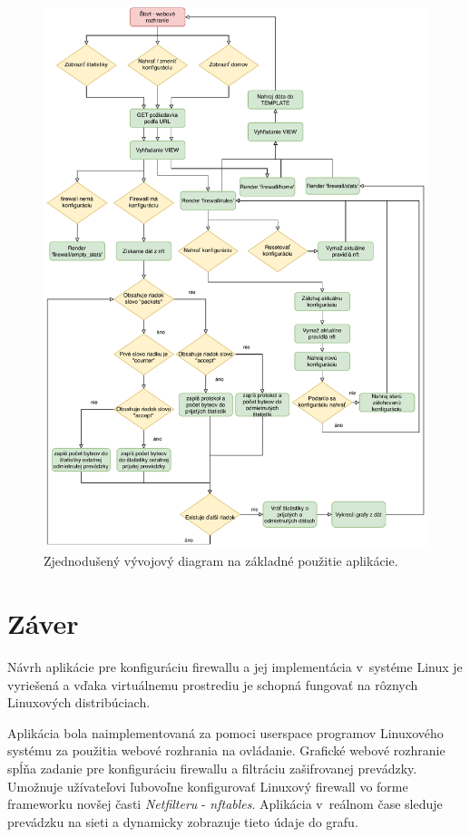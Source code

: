 \begin{figure}[h]
	\centering
	\includegraphics[scale=0.73]{obrazky-figures/flowchart.pdf}
	\caption{Zjednodušený vývojový diagram na základné použitie aplikácie.}
	\label{flowchart}
\end{figure}

\chapter*{Záver}

Návrh aplikácie pre konfiguráciu firewallu a jej implementácia v~systéme Linux je vyriešená a vďaka virtuálnemu prostrediu je schopná fungovať na rôznych Linuxových distribúciach. 

Aplikácia bola naimplementovaná za pomoci userspace programov Linuxového systému za použitia webové rozhrania na ovládanie.
Grafické webové rozhranie spĺňa zadanie pre konfiguráciu firewallu a filtráciu zašifrovanej prevádzky. Umožnuje užívateľovi ľubovoľne konfigurovať Linuxový firewall vo forme frameworku novšej časti \emph{Netfilteru} - \emph{nftables}. Aplikácia v~reálnom čase sleduje prevádzku na sieti a dynamicky zobrazuje tieto údaje do grafu. 

